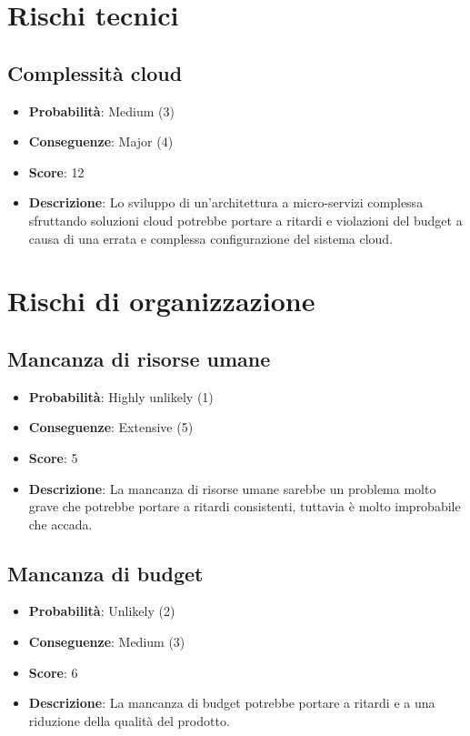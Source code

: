 \documentclass{article}
\begin{document}
  \section{Rischi tecnici}

  \subsection{Complessità cloud}
  \begin{itemize}
    \item \textbf{Probabilità}: Medium (3)
    \item \textbf{Conseguenze}: Major (4)
    \item \textbf{Score}: 12
    \item \textbf{Descrizione}: Lo sviluppo di un'architettura a micro-servizi complessa sfruttando
        soluzioni cloud potrebbe portare a ritardi e violazioni del budget a causa di una
        errata e complessa configurazione del sistema cloud.
  \end{itemize}


  \section{Rischi di organizzazione}
  \subsection{Mancanza di risorse umane}
  \begin{itemize}
    \item \textbf{Probabilità}: Highly unlikely (1)
    \item \textbf{Conseguenze}: Extensive (5)
    \item \textbf{Score}: 5
    \item \textbf{Descrizione}: La mancanza di risorse umane sarebbe un problema molto 
        grave che potrebbe portare a ritardi consistenti, tuttavia è molto improbabile 
        che accada.
  \end{itemize}

  \subsection{Mancanza di budget}
  \begin{itemize}
    \item \textbf{Probabilità}: Unlikely (2)
    \item \textbf{Conseguenze}: Medium (3)
    \item \textbf{Score}: 6
    \item \textbf{Descrizione}: La mancanza di budget potrebbe portare a ritardi e 
        a una riduzione della qualità del prodotto.
  \end{itemize}
\end{document}
